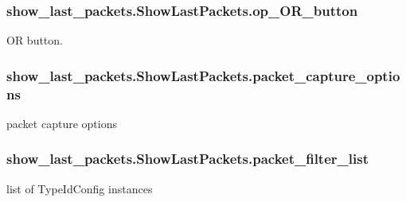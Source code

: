 \subsubsection[{\texorpdfstring{op\+\_\+\+O\+R\+\_\+button}{op_OR_button}}]{\setlength{\rightskip}{0pt plus 5cm}show\+\_\+last\+\_\+packets.\+Show\+Last\+Packets.\+op\+\_\+\+O\+R\+\_\+button}\hypertarget{classshow__last__packets_1_1ShowLastPackets_a5aab12d35452ca9ac07f85777b7850d2}{}\label{classshow__last__packets_1_1ShowLastPackets_a5aab12d35452ca9ac07f85777b7850d2}


OR button. 

\subsubsection[{\texorpdfstring{packet\+\_\+capture\+\_\+options}{packet_capture_options}}]{\setlength{\rightskip}{0pt plus 5cm}show\+\_\+last\+\_\+packets.\+Show\+Last\+Packets.\+packet\+\_\+capture\+\_\+options}\hypertarget{classshow__last__packets_1_1ShowLastPackets_a66331507375ad09ebb8ffae3450ec38c}{}\label{classshow__last__packets_1_1ShowLastPackets_a66331507375ad09ebb8ffae3450ec38c}


packet capture options 

\subsubsection[{\texorpdfstring{packet\+\_\+filter\+\_\+list}{packet_filter_list}}]{\setlength{\rightskip}{0pt plus 5cm}show\+\_\+last\+\_\+packets.\+Show\+Last\+Packets.\+packet\+\_\+filter\+\_\+list}\hypertarget{classshow__last__packets_1_1ShowLastPackets_afb948244d0751d3a493657bb1b3af47f}{}\label{classshow__last__packets_1_1ShowLastPackets_afb948244d0751d3a493657bb1b3af47f}


list of Type\+Id\+Config instances 

